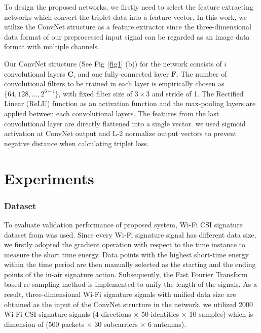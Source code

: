 \documentclass[runningheads]{llncs}
\begin{document}
To design the proposed networks, we firstly need to select the feature extracting networks which convert the triplet data into a feature vector. In this work, we utilize the ConvNet structure \cite{lecun1998gradient} as a feature extractor since the three-dimensional data format of our preprocessed input signal can be regarded as an image data format with multiple channels. 

Our ConvNet structure (See Fig~\ref{fig1} (b)) for the network consists of $i$ convolutional layers $\mathbf{C}_{i}$ and one fully-connected layer $\mathbf{F}$. The number of convolutional filters to be trained in each layer is empirically chosen as $\{64, 128, ...,  2^{6+i}\}$, with fixed filter size of $3\times3$ and stride of 1. The Rectiﬁed Linear (ReLU) function as an activation function and the max-pooling layers are applied between each convolutional layers. The features from the last convolutional layer are directly flattened into a single vector.
we used sigmoid activation at ConvNet output and L-2 normalize output vectors to prevent negative distance when calculating triplet loss.


\section{Experiments}

\subsubsection{Dataset}
 To evaluate validation performance of proposed system, Wi-Fi CSI signature dataset from \cite{moon2017air} was used.
 Since every Wi-Fi signature signal has different data size, we firstly adopted the gradient operation with respect to the time instance to measure the short time energy. Data points with the highest short-time energy within the time period are then manually selected as the starting and the ending points of the in-air signature action. Subsequently, the Fast Fourier Transform based re-sampling method \cite{moon2017air} is implemented to unify the length of the signals. As a result, three-dimensional Wi-Fi signature signals with unified data size are obtained as the input of the ConvNet structure in the network.
 we utilized 2000 Wi-Fi CSI signature signals (4 directions $\times$ 50 identities $\times$ 10 samples) which is dimension of (500 packets $\times$ 30 subcarriers $\times$ 6 antennas). 
 
\end{document}
